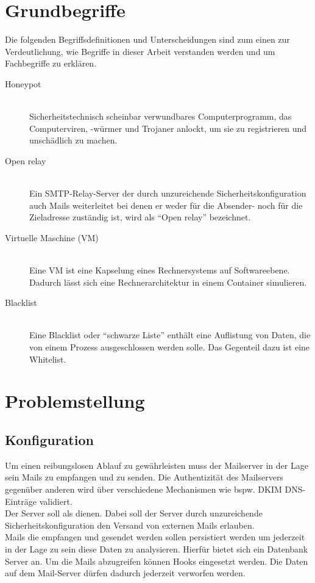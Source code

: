 \documentclass[a4paper,11pt,singlespacing]{article}
\begin{document}
\section{Grundbegriffe}\label{sec:Grundbegriffe}
	Die folgenden Begriffsdefinitionen und Unterscheidungen sind zum einen zur Verdeutlichung, wie Begriffe in dieser Arbeit verstanden werden und um Fachbegriffe zu erklären.
	
	\begin{description}
	\item[Honeypot\label{itm:Honeypot}]\hfill \\
		Sicherheitstechnisch scheinbar verwundbares Computerprogramm, das Computerviren, -würmer und Trojaner anlockt, um sie zu registrieren und unschädlich zu machen.\cite{Honeypot}
	\item[Open relay\label{itm:OpenRelay}]\hfill \\
		Ein SMTP-Relay-Server der durch unzureichende Sicherheitskonfiguration auch Mails weiterleitet bei denen er weder für die Absender- noch für die Zieladresse zuständig ist, wird als "`Open relay"' bezeichnet.\cite{SMTP-Relay-Server}
	\item[Virtuelle Maschine (VM)\label{itm:VirtuelleMaschine}]\hfill \\
		Eine VM ist eine Kapselung eines Rechnersystems auf Softwareebene. Dadurch lässt sich eine Rechnerarchitektur in einem Container simulieren. \cite{VM}
	\item[Blacklist \label{itm:Blacklist}]\hfill \\
		 Eine Blacklist oder "`schwarze Liste"' enthält eine Auflistung von Daten, die von einem Prozess ausgeschlossen werden solle. Das Gegenteil dazu ist eine Whitelist. \cite{Blacklist}
	\end{description}


\section{Problemstellung}\label{sec:Problemstellung}
	\subsection{Konfiguration}\label{sec:ProblemstellungKonfiguration}
		Um einen reibungslosen Ablauf zu gewährleisten muss der Mailserver in der Lage sein Mails zu empfangen und zu senden.
		Die Authentizität des Mailservers gegenüber anderen wird über verschiedene Mechanismen wie bspw. DKIM DNS-Einträge validiert. %
		\\
		Der Server soll als  dienen.
		Dabei soll der Server durch unzureichende Sicherheitskonfiguration den Versand von externen Mails erlauben.
		\\
		Mails die empfangen und gesendet werden sollen persistiert werden um jederzeit in der Lage zu sein diese Daten zu analysieren.
		Hierfür bietet sich ein Datenbank Server an. Um die Mails abzugreifen können Hooks eingesetzt werden. %
		Die Daten auf dem Mail-Server dürfen dadurch jederzeit verworfen werden.
\end{document}
